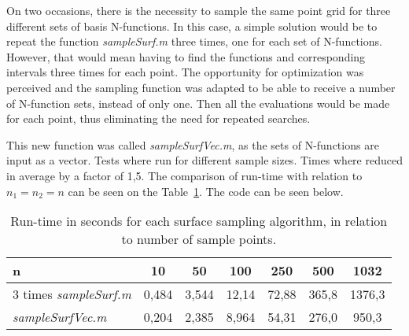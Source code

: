 	On two occasions, there is the necessity to sample the same point grid for three different sets of basis N-functions. In this case, a simple solution would be to repeat the function \textit{sampleSurf.m} three times, one for each set of N-functions. However, that would mean having to find the functions and corresponding intervals three times for each point. The opportunity for optimization was perceived and the sampling function was adapted to be able to receive a number of N-function sets, instead of only one. Then all the evaluations would be made for each point, thus eliminating the need for repeated searches.
	
	This new function was called \textit{sampleSurfVec.m}, as the sets of N-functions are input as a vector. Tests where run for different sample sizes. Times where reduced in average by a factor of 1,5. The comparison of run-time with relation to $n_1=n_2=n$ can be seen on the Table~\ref{tab:samplesurfvec}. The code can be seen below.\newline
	
	\begin{table}[H]
	\centering
	\captionsetup{justification=centering}
	\begin{tabular}{l c c c c c c}
	\hline
	n & 10 & 50 & 100 & 250 & 500 & 1032\\\hline
	3 times \textit{sampleSurf.m} & 0,484 & 3,544 & 12,14 & 72,88 & 365,8 & 1376,3\\
	\textit{sampleSurfVec.m} & 0,204 & 2,385 & 8,964 & 54,31 & 276,0 & 950,3\\
	\hline
	\end{tabular}
	\caption{Run-time in seconds for each surface sampling algorithm, in relation to number of sample points.}
	\label{tab:samplesurfvec}
	\end{table}
	\newpage
	

